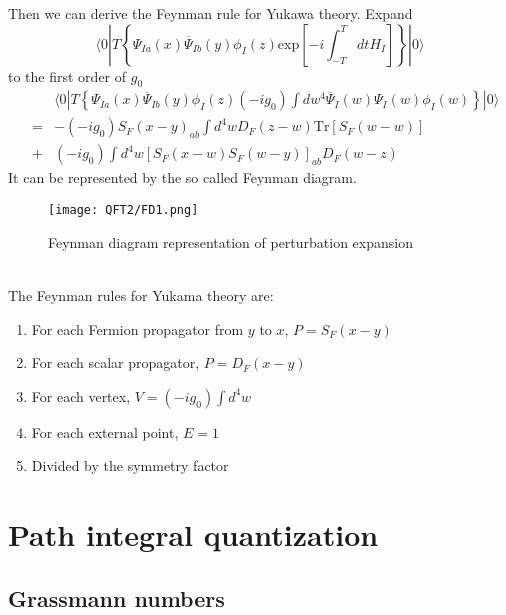 \noindent
Then we can derive the Feynman rule for Yukawa theory. 
Expand
\[\langle 0 | T \left\{ \Psi_{Ia}(x) \overline{\Psi}_{Ib}(y) \phi_I(z) \mathrm{exp} \left[ -i \int_{-T}^{T} dt H_I \right]\right\} | 0 \rangle\] 
to the first order of $g_0$
\begin{eqnarray}
& &\langle 0 | T \left\{ \Psi_{Ia}(x) \overline{\Psi}_{Ib}(y) \phi_I(z) (-i g_0) \int dw^4 \overline{\Psi}_I(w) \Psi_I(w) \phi_I(w) \right\} | 0 \rangle \nonumber \\
&=& -(-ig_0) S_F(x-y)_{ab} \int d^4 w D_F(z-w) \mathrm{Tr}[S_F(w-w)] \nonumber \\
&+&  (-ig_0) \int d^4 w  [S_F(x-w) S_F(w-y)]_{ab} D_F(w-z) \nonumber
\end{eqnarray}
It can be represented by the so called Feynman diagram.
\begin{figure}[!h]
\centering
\texttt{[image: QFT2/FD1.png]}
\caption{Feynman diagram representation of perturbation expansion}
\end{figure}\\
The Feynman rules for Yukama theory are:
\begin{enumerate}
\item For each Fermion propagator from $y$ to $x$, $P = S_F(x-y)$
\item For each scalar propagator, $P = D_F(x-y)$
\item For each vertex, $V = (-ig_0)\int d^4w$
\item For each external point, $E=1$
\item Divided by the symmetry factor
\end{enumerate}

\section{Path integral quantization}
\subsection{Grassmann numbers}
